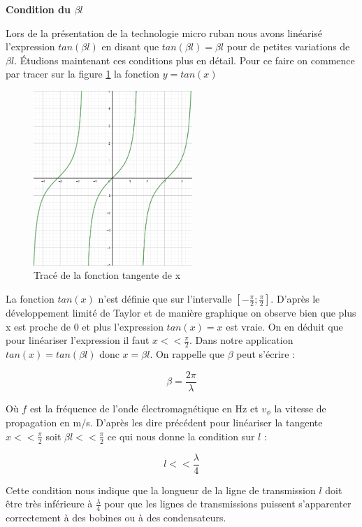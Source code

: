 \documentclass[french]{article}
\begin{document}
\textbf{Condition du $\beta l$\\}

Lors de la présentation de la technologie micro ruban nous avons linéarisé l'expression $tan(\beta l)$ en disant que $tan(\beta l)=\beta l$ pour de petites variations de $\beta l$. Étudions maintenant ces conditions plus en détail. Pour ce faire on commence par tracer sur la figure \ref{fig:tan_x} la fonction $y = tan(x)$

\begin{figure}[H]
	\centering
	\includegraphics[width=6cm]{photo/tan_x.png}
	\caption{Tracé de la fonction tangente de x}
	\label{fig:tan_x}
\end{figure}

La fonction $tan(x)$ n'est définie que sur l'intervalle $[-\frac{\pi}{2}; \frac{\pi}{2}]$. D'après le développement limité de Taylor et de manière graphique on observe bien que plus x est proche de 0 et plus l'expression $tan(x) = x$ est vraie. On en déduit que pour linéariser l'expression il faut $x << \frac{\pi}{2}$. Dans notre application $tan(x) = tan(\beta l)$ donc $x = \beta l$. On rappelle que $\beta$ peut s'écrire :

\begin{equation}
	\beta = \frac{2 \pi}{\lambda}
\end{equation}

Où $f$ est la fréquence de l'onde électromagnétique en Hz et $v_\phi$ la vitesse de propagation en m/s. D'après les dire précédent pour linéariser la tangente $x << \frac{\pi}{2}$ soit $\beta l << \frac{\pi}{2}$ ce qui nous donne la condition sur $l$ :

\begin{equation}
	l << \frac{\lambda}{4}
\end{equation}

Cette condition nous indique que la longueur de la ligne de transmission $l$ doit être très inférieure à $\frac{\lambda}{4}$ pour que les lignes de transmissions puissent s'apparenter correctement à des bobines ou à des condensateurs.
\end{document}
